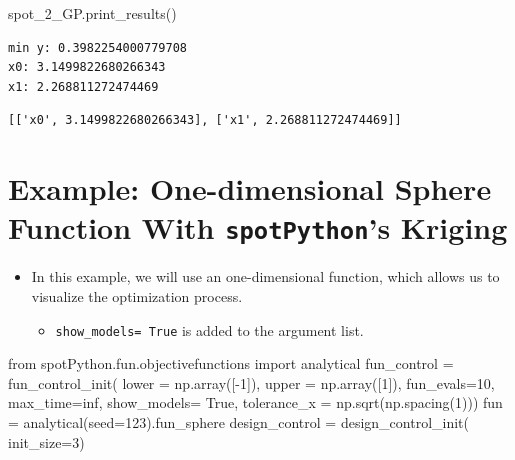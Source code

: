 \documentclass[
  letterpaper,
  DIV=11,
  numbers=noendperiod]{scrreprt}
\newenvironment{Shaded}{\begin{snugshade}}{\end{snugshade}}
\newcommand{\DecValTok}[1]{\textcolor[rgb]{0.68,0.00,0.00}{#1}}
\newcommand{\ImportTok}[1]{\textcolor[rgb]{0.00,0.46,0.62}{#1}}
\newcommand{\NormalTok}[1]{\textcolor[rgb]{0.00,0.23,0.31}{#1}}
\newcommand{\OperatorTok}[1]{\textcolor[rgb]{0.37,0.37,0.37}{#1}}
\newcommand{\VariableTok}[1]{\textcolor[rgb]{0.07,0.07,0.07}{#1}}
\providecommand{\tightlist}{%
  \setlength{\itemsep}{0pt}\setlength{\parskip}{0pt}}\usepackage{longtable,booktabs,array}
\begin{document}
\begin{Shaded}
\begin{Highlighting}[]
\NormalTok{spot\_2\_GP.print\_results()}
\end{Highlighting}
\end{Shaded}

\begin{verbatim}
min y: 0.3982254000779708
x0: 3.1499822680266343
x1: 2.268811272474469
\end{verbatim}

\begin{verbatim}
[['x0', 3.1499822680266343], ['x1', 2.268811272474469]]
\end{verbatim}

\section{\texorpdfstring{Example: One-dimensional Sphere Function With
\texttt{spotPython}'s
Kriging}{Example: One-dimensional Sphere Function With spotPython's Kriging}}\label{example-one-dimensional-sphere-function-with-spotpythons-kriging}

\begin{itemize}
\tightlist
\item
  In this example, we will use an one-dimensional function, which allows
  us to visualize the optimization process.

  \begin{itemize}
  \tightlist
  \item
    \texttt{show\_models=\ True} is added to the argument list.
  \end{itemize}
\end{itemize}

\begin{Shaded}
\begin{Highlighting}[]
\ImportTok{from}\NormalTok{ spotPython.fun.objectivefunctions }\ImportTok{import}\NormalTok{ analytical}
\NormalTok{fun\_control }\OperatorTok{=}\NormalTok{ fun\_control\_init(}
\NormalTok{    lower }\OperatorTok{=}\NormalTok{ np.array([}\OperatorTok{{-}}\DecValTok{1}\NormalTok{]),}
\NormalTok{    upper }\OperatorTok{=}\NormalTok{ np.array([}\DecValTok{1}\NormalTok{]),}
\NormalTok{    fun\_evals}\OperatorTok{=}\DecValTok{10}\NormalTok{,}
\NormalTok{    max\_time}\OperatorTok{=}\NormalTok{inf,}
\NormalTok{    show\_models}\OperatorTok{=} \VariableTok{True}\NormalTok{,}
\NormalTok{    tolerance\_x }\OperatorTok{=}\NormalTok{ np.sqrt(np.spacing(}\DecValTok{1}\NormalTok{)))}
\NormalTok{fun }\OperatorTok{=}\NormalTok{ analytical(seed}\OperatorTok{=}\DecValTok{123}\NormalTok{).fun\_sphere}
\NormalTok{design\_control }\OperatorTok{=}\NormalTok{ design\_control\_init(}
\NormalTok{    init\_size}\OperatorTok{=}\DecValTok{3}\NormalTok{)}
\end{Highlighting}
\end{Shaded}
\end{document}
